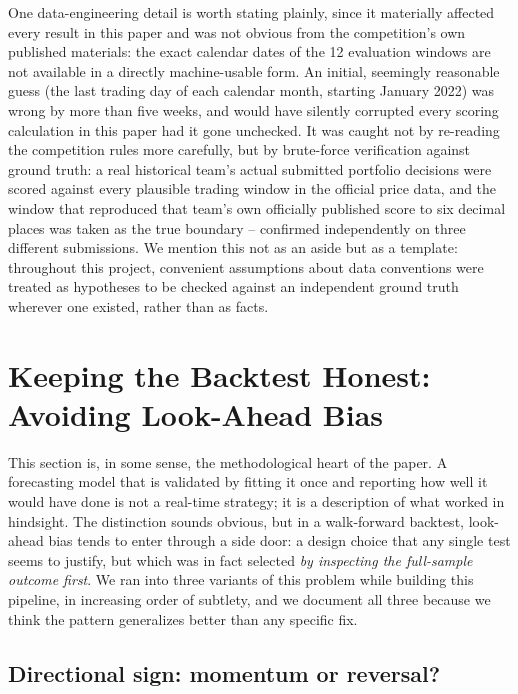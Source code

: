 \documentclass[11pt]{article}
\begin{document}
One data-engineering detail is worth stating plainly, since it materially
affected every result in this paper and was not obvious from the competition's
own published materials: the exact calendar dates of the 12 evaluation windows
are not available in a directly machine-usable form. An initial, seemingly
reasonable guess (the last trading day of each calendar month, starting
January 2022) was wrong by more than five weeks, and would have silently
corrupted every scoring calculation in this paper had it gone unchecked. It
was caught not by re-reading the competition rules more carefully, but by
brute-force verification against ground truth: a real historical team's actual
submitted portfolio decisions were scored against every plausible trading
window in the official price data, and the window that reproduced that team's
own officially published score to six decimal places was taken as the true
boundary -- confirmed independently on three different submissions. We
mention this not as an aside but as a template: throughout this project,
convenient assumptions about data conventions were treated as hypotheses to be
checked against an independent ground truth wherever one existed, rather than
as facts.

\section{Keeping the Backtest Honest: Avoiding Look-Ahead Bias}
\label{sec:realtime}

This section is, in some sense, the methodological heart of the paper. A
forecasting model that is validated by fitting it once and reporting how well
it would have done is not a real-time strategy; it is a description of what
worked in hindsight. The distinction sounds obvious, but in a walk-forward
backtest, look-ahead bias tends to enter through a side door: a design choice
that any single test seems to justify, but which was in fact selected
\emph{by inspecting the full-sample outcome first}. We ran into three variants
of this problem while building this pipeline, in increasing order of
subtlety, and we document all three because we think the pattern
generalizes better than any specific fix.

\subsection{Directional sign: momentum or reversal?}
\label{sec:momentum-sign}
\end{document}
